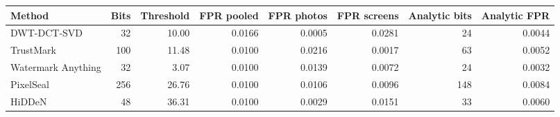 \begin{tabular}{lrrrrrrr}
\toprule
Method & Bits & Threshold & FPR pooled & FPR photos & FPR screens & Analytic bits & Analytic FPR \\
\midrule
DWT-DCT-SVD & 32 & 10.00 & 0.0166 & 0.0005 & 0.0281 & 24 & 0.0044 \\
TrustMark & 100 & 11.48 & 0.0100 & 0.0216 & 0.0017 & 63 & 0.0052 \\
Watermark Anything & 32 & 3.07 & 0.0100 & 0.0139 & 0.0072 & 24 & 0.0032 \\
PixelSeal & 256 & 26.76 & 0.0100 & 0.0106 & 0.0096 & 148 & 0.0084 \\
HiDDeN & 48 & 36.31 & 0.0100 & 0.0029 & 0.0151 & 33 & 0.0060 \\
\bottomrule
\end{tabular}
